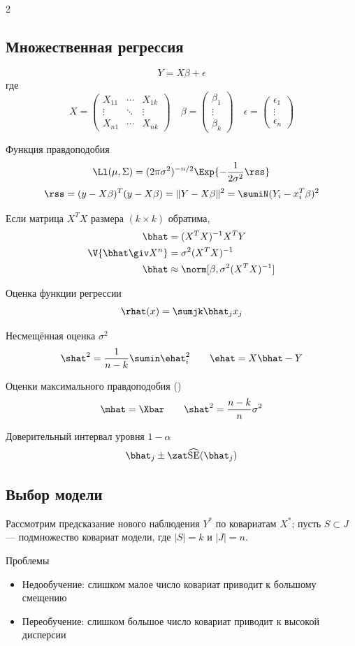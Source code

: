 \documentclass[landscape]{article}
\def\sehat{\ensuremath{\widehat{\mathrm{SE}}}}
\begin{document}
\begin{multicols*}{2}
\subsection{Множественная регрессия}

\[Y = X\beta + \epsilon\]
где
\[X =
\begin{pmatrix} X_{11} & \cdots & X_{1k} \\ \vdots & \ddots & \vdots \\
  X_{n1} & \cdots & X_{nk}\end{pmatrix} \quad
\beta = \begin{pmatrix}\beta_1 \\ \vdots \\ \beta_k\end{pmatrix} \quad
\epsilon = \begin{pmatrix}\epsilon_1 \\ \vdots \\ \epsilon_n\end{pmatrix}\]

Функция правдоподобия
\[\Ll(\mu,\Sigma) = (2\pi\sigma^2)^{-n/2} \Exp{-\frac{1}{2\sigma^2}\rss}\]
\[\rss = (y-X\beta)^T(y-X\beta) = \|Y-X\beta\|^2 = \sumiN(Y_i-x_i^T\beta)^2\]

Если матрица $X^TX$ размера $(k \times k)$ обратима,
\begin{align*}
  \bhat &= (X^TX)^{-1}X^TY \\
  \V{\bhat \giv X^n} &= \sigma^2(X^TX)^{-1} \\
  \bhat &\approx \norm[\beta, \sigma^2(X^TX)^{-1}]
\end{align*}

Оценка функции регрессии
\[\rhat(x) = \sumjk\bhat_j x_j\]

Несмещённая оценка $\sigma^2$
\[\shat^2 = \frac{1}{n-k} \sumin \ehat_i^2 \qquad \ehat = X\bhat-Y\]

Оценки максимального правдоподобия (\mle)
\[\mhat = \Xbar \qquad \shat^2 = \frac{n-k}{n}\sigma^2\]

Доверительный интервал уровня $1-\alpha$
\[\bhat_j \pm \zat\sehat(\bhat_j)\]

\subsection{Выбор модели}

Рассмотрим предсказание нового наблюдения $Y^*$ по ковариатам $X^*$; пусть $S
\subset J$ — подмножество ковариат модели, где $|S| = k$ и $|J| = n$.

Проблемы
\begin{itemize}
  \item Недообучение: слишком малое число ковариат приводит к большому смещению
  \item Переобучение: слишком большое число ковариат приводит к высокой дисперсии
\end{itemize}


\end{multicols*}
\end{document}

